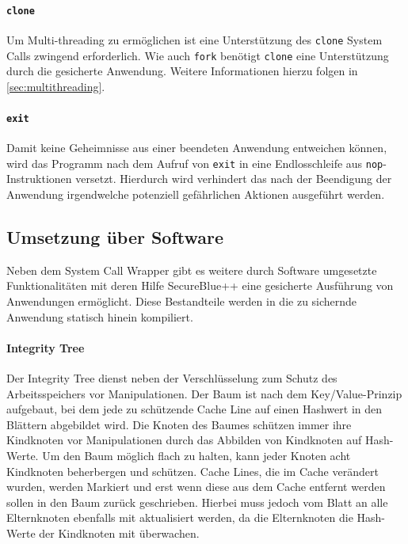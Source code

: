 \documentclass[ngerman]{sig-alternate-05-2015}
\begin{document}
\paragraph{\texttt{clone}}
Um Multi-threading zu ermöglichen ist eine Unterstützung des \texttt{clone} System Calls zwingend erforderlich. Wie auch \texttt{fork} benötigt \texttt{clone} eine Unterstützung durch die gesicherte Anwendung. Weitere Informationen hierzu folgen in \cref{sec:multithreading}.

\paragraph{\texttt{exit}}
Damit keine Geheimnisse aus einer beendeten Anwendung entweichen können, wird das Programm nach dem Aufruf von \texttt{exit} in eine Endlosschleife aus \texttt{nop}-Instruktionen versetzt. Hierdurch wird verhindert das nach der Beendigung der Anwendung irgendwelche potenziell gefährlichen Aktionen ausgeführt werden. 

\subsection{Umsetzung über Software}
Neben dem System Call Wrapper gibt es weitere durch Software umgesetzte Funktionalitäten mit deren Hilfe SecureBlue++ eine gesicherte Ausführung von Anwendungen ermöglicht. Diese Bestandteile werden in die zu sichernde Anwendung statisch hinein kompiliert. 

\paragraph{Integrity Tree}
\label{sec:Integritätsbaum}
Der Integrity Tree dienst neben der Verschlüsselung zum Schutz des Arbeitsspeichers vor Manipulationen. Der Baum ist nach dem Key/Value-Prinzip aufgebaut, bei dem jede zu schützende Cache Line auf einen Hashwert in den Blättern abgebildet wird. Die Knoten des Baumes schützen immer ihre Kindknoten vor Manipulationen durch das Abbilden von Kindknoten auf Hash-Werte. Um den Baum möglich flach zu halten, kann jeder Knoten acht Kindknoten beherbergen und schützen. Cache Lines, die im Cache verändert wurden, werden Markiert und erst wenn diese aus dem Cache entfernt werden sollen in den Baum zurück geschrieben. Hierbei muss jedoch vom Blatt an alle Elternknoten ebenfalls mit aktualisiert werden, da die Elternknoten die Hash-Werte der Kindknoten mit überwachen.
\end{document}
